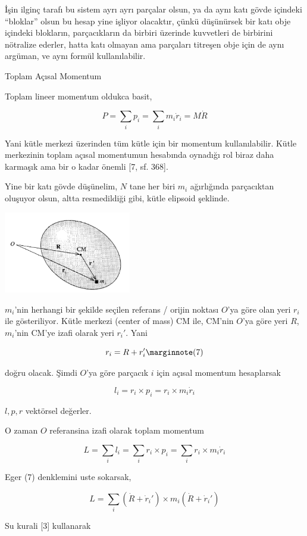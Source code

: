 \documentclass[12pt,fleqn]{article}\usepackage{../../common}
\begin{document}
İşin ilginç tarafı bu sistem ayrı ayrı parçalar olsun, ya da aynı katı gövde
içindeki ``bloklar'' olsun bu hesap yine işliyor olacaktır, çünkü düşünürsek bir
katı obje içindeki blokların, parçacıkların da birbiri üzerinde kuvvetleri de
birbirini nötralize ederler, hatta katı olmayan ama parçaları titreşen obje için
de aynı argüman, ve aynı formül kullanılabilir.

Toplam Açısal Momentum

Toplam lineer momentum oldukca basit,

$$
P = \sum_i p_i = \sum_i m_i \dot{r}_i = M \dot{R}
$$

Yani kütle merkezi üzerinden tüm kütle için bir momentum kullanılabilir. Kütle
merkezinin toplam açısal momentumun hesabında oynadığı rol biraz daha karmaşık
ama bir o kadar önemli [7, sf. 368].

Yine bir katı gövde düşünelim, $N$ tane her biri $m_i$ ağırlığında parçacıktan
oluşuyor olsun, altta resmedildiği gibi, kütle elipsoid şeklinde.

\includegraphics[width=15em]{phy_005_basics_09.png}

$m_i$'nin herhangi bir şekilde seçilen referans / orijin noktası $O$'ya göre
olan yeri $r_i$ ile gösteriliyor. Kütle merkezi (center of mass) CM ile,
CM'nin $O$'ya göre yeri $R$, $m_i$'nin CM'ye izafi olarak yeri $r_i'$. Yani

$$
r_i = R + r_i'
\mlabel{7}
$$

doğru olacak. Şimdi $O$'ya göre parçacık $i$ için açısal momentum hesaplarsak

$$
l_i = r_i \times p_i = r_i \times m_i \dot{r}_i
$$

$l,p,r$ vektörsel değerler.

O zaman $O$ referansina izafi olarak toplam momentum

$$
L = \sum_i l_i = \sum_i r_i \times p_i = \sum_i r_i \times m_i \dot{r}_i
$$

Eger (7) denklemini uste sokarsak,

$$
L = \sum_i (\dot{R} + \dot{r}_i') \times m_i (\dot{R} + \dot{r}_i' )
$$

Su kurali [3] kullanarak
\end{document}
